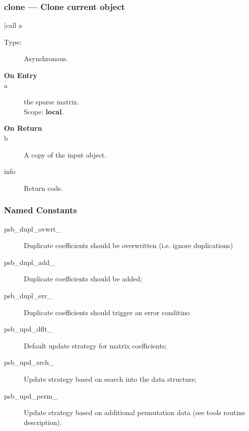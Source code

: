 \subsubsection{clone --- Clone current object}

\fortinline|call  a%

\begin{description}
\item[Type:] Asynchronous.
\item[\bf On Entry]
\item[a] the sparse matrix.\\
Scope: {\bf local}.\\
\end{description}

\begin{description}
\item[\bf On Return]
\item[b] A copy of the input object.
\item[info] Return code. 
\end{description}


\subsubsection{Named Constants}
\label{sec:sp_constants}
\begin{description}
\item[psb\_dupl\_ovwrt\_] Duplicate coefficients should be overwritten
  (i.e. ignore duplications)
\item[psb\_dupl\_add\_] Duplicate coefficients should be added;	         
\item[psb\_dupl\_err\_] Duplicate coefficients should trigger an error conditino
\item[psb\_upd\_dflt\_] Default update strategy for matrix coefficients;
\item[psb\_upd\_srch\_] Update strategy based on search into the data structure;
\item[psb\_upd\_perm\_] Update strategy based on additional
  permutation data (see tools routine description).
\end{description}


